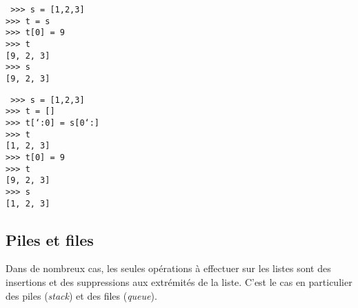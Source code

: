 \noindent\mbox{}\hspace*{1cm}\begin{py}{6.5cm}\tt
>>> s = [1,2,3]\\
>>> t = s\\
>>> t[0] = 9\\
>>> t\\
\mbox{}[9, 2, 3]\\
>>> s\\
\mbox{}[9, 2, 3]
\end{py}
\hfill
\begin{py}{6.5cm}\tt
>>> s = [1,2,3]\\
>>> t = []\\
>>> t[\char`:0] = s[0\char`:]\\
>>> t\\
\mbox{}[1, 2, 3]\\
>>> t[0] = 9\\
>>> t\\
\mbox{}[9, 2, 3]\\
>>> s\\
\mbox{}[1, 2, 3]
\end{py}
\vspace*{2mm}


\subsection{Piles et files}\label{pilefile}
Dans de nombreux cas, les seules opérations à effectuer sur les 
listes sont des insertions et des suppressions aux extrémités de la liste.
C'est le cas en particulier des piles ({\em stack}) et des files ({\em queue}).

